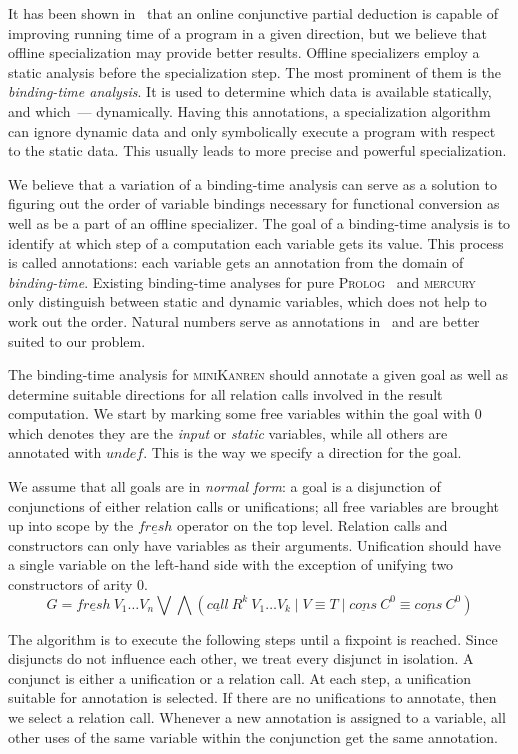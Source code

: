 \documentclass[submission,copyright,creativecommons]{eptcs}
\newcommand{\miniKanren}{\textsc{miniKanren}}
\newcommand{\prolog}{\textsc{Prolog}}
\newcommand{\mercury}{\textsc{mercury}}
\begin{document}
It has been shown in~\cite{lozov2019relational} that an online conjunctive partial deduction is capable of improving running time of a program in a given direction, but we believe that offline specialization may provide better results.
Offline specializers employ a static analysis before the specialization step.
The most prominent of them is the \emph{binding-time analysis}.
It is used to determine which data is available statically, and which~--- dynamically.
Having this annotations, a specialization algorithm can ignore dynamic data and only symbolically execute a program with respect to the static data.
This usually leads to more precise and powerful specialization.

We believe that a variation of a binding-time analysis can serve as a solution to figuring out the order of variable bindings necessary for functional conversion as well as be a part of an offline specializer.
The goal of a binding-time analysis is to identify at which step of a computation each variable gets its value.
This process is called annotations: each variable gets an annotation from the domain of \emph{binding-time}.
Existing binding-time analyses for pure \prolog{}~\cite{craig2004fully} and \mercury{}~\cite{vanhoof2004binding} only distinguish between static and dynamic variables, which does not help to work out the order.
Natural numbers serve as annotations in~\cite{Thiemann1997AUF} and are better suited to our problem.

The binding-time analysis for \miniKanren{} should annotate a given goal as well as determine suitable directions for all relation calls involved in the result computation.
We start by marking some free variables within the goal with $0$ which denotes they are the \emph{input} or \emph{static} variables, while all others are annotated with $undef$.
This is the way we specify a direction for the goal.

We assume that all goals are in \emph{normal form}: a goal is a disjunction of conjunctions of either relation calls or unifications; all free variables are brought up into scope by the $\underline{fresh}$ operator on the top level. Relation calls and constructors can only have variables as their arguments. Unification should have a single variable on the left-hand side with the exception of unifying two constructors of arity $0$.
$$G = \underline{fresh} \ V_1 \dots V_n \bigvee \bigwedge (\underline{call} \ R^k \ V_1 \dots V_k \mid V \equiv T \mid \underline{cons} \ C^0 \equiv \underline{cons} \ C^0)$$

The algorithm is to execute the following steps until a fixpoint is reached.
Since disjuncts do not influence each other, we treat every disjunct in isolation.
A conjunct is either a unification or a relation call.
At each step, a unification suitable for annotation is selected.
If there are no unifications to annotate, then we select a relation call.
Whenever a new annotation is assigned to a variable, all other uses of the same variable within the conjunction get the same annotation.
\end{document}
